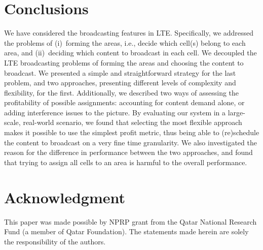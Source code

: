 \documentclass[10pt, conference, compsocconf]{IEEEtran}
\numberwithin{equation}{section}
\begin{document}
\section{Conclusions
\label{sec:conclusions}
}

We have considered the broadcasting features in LTE.
Specifically, we
addressed the problems of (i)~forming the areas, i.e., decide which
cell(s) belong to each area, and (ii)~deciding which content to
broadcast in each cell.
We
decoupled the LTE broadcasting problems of forming the areas and choosing the
content to broadcast. We presented a simple and straightforward strategy
for the last problem, and two approaches, presenting different levels of
complexity and flexibility, for the first. 
Additionally, we described two
ways of assessing the profitability of possible assignments:
accounting for content demand alone, or adding interference issues to
the picture.
By evaluating our system in a large-scale, real-world scenario, we
found that selecting the most flexible approach makes it possible to use
the simplest profit metric, thus being able to (re)schedule the content
to broadcast on a very fine time granularity. 
We also investigated the
reason for the difference in performance between the two approaches, and
found that trying to assign all cells to an area is harmful to the
overall performance.

\section*{Acknowledgment}
This paper was made possible by NPRP grant  from the Qatar National Research Fund (a member of Qatar
Foundation). The statements made herein are solely the responsibility of
the authors. 
\end{document}
